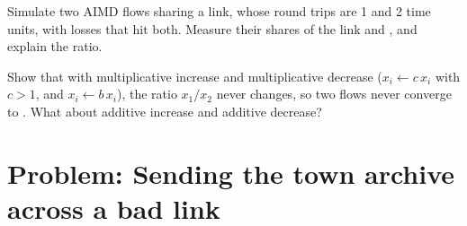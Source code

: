 \begin{exercise}[$\star\star\star$]\label{exo:b2:transport-layer:11}
Simulate two AIMD flows sharing a link, whose round trips are 1 and 2 time units, with losses that hit both. Measure
their shares of the link and , and explain the ratio.
\end{exercise}

\begin{exercise}[$\star\star\star$]\label{exo:b2:transport-layer:12}
Show that with multiplicative increase and multiplicative decrease ($x_i \leftarrow c\,x_i$ with $c > 1$, and $x_i
\leftarrow b\,x_i$), the ratio $x_1/x_2$ never changes, so two flows never converge to . What about additive
increase and additive decrease?
\end{exercise}

\section{Problem: Sending the town archive across a bad link}\label{sec:b2:transport-layer:problem}

